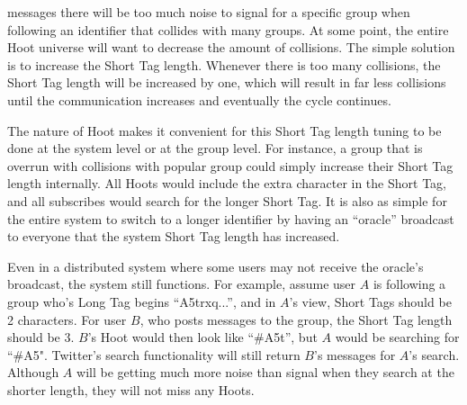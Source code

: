 \documentclass{sig-alternate-arxiv}
\newcommand{\hoot}{{\tt \#h00t}\xspace}
\begin{document}
%

messages  there will be too much noise to signal for a specific group when following an identifier that collides with many groups. At some point, the entire Hoot universe will want to decrease the amount of collisions. The simple solution is to increase the Short Tag length. Whenever there is too many collisions, the Short Tag length will be increased by one, which will result in far less collisions until the communication increases and eventually the cycle continues. 

The nature of Hoot makes it convenient for this Short Tag length tuning to be done at the system level or at the group level. For instance, a group that is overrun with collisions with popular group could simply increase their Short Tag length internally. All Hoots would include the extra character in the Short Tag, and all subscribes would search for the longer Short Tag. It is also as simple for the entire system to switch to a longer identifier by having an ``oracle'' broadcast to everyone that the system Short Tag length has increased.

Even in a distributed system where some users may not receive the oracle's broadcast, the system still functions. For example, assume user $A$ is following a group who's Long Tag begins ``A5trxq...'', and in $A$'s view, Short Tags should be 2 characters. For user $B$, who posts messages to the group, the Short Tag length should be 3. $B$'s Hoot would then look like ``\#A5t'', but $A$ would be searching for ``\#A5". Twitter's search functionality will still return $B$'s messages for $A$'s search. Although $A$ will be getting much more noise than signal when they search at the shorter length, they will not miss any Hoots.
\end{document}

